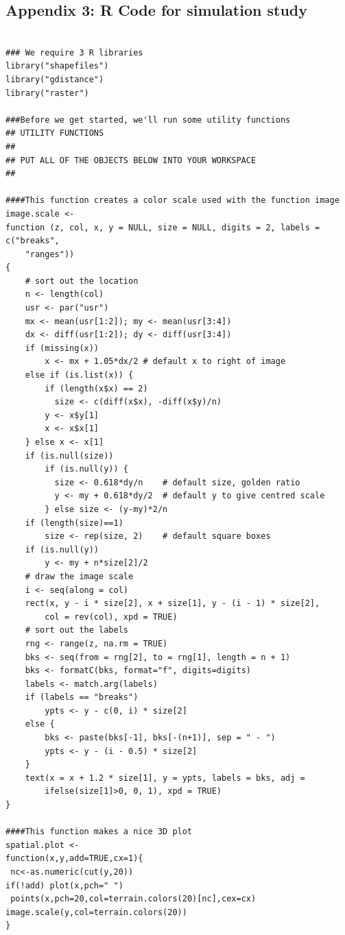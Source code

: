 \documentclass[12pt]{article}
\begin{document}
\begin{spacing}{1.2}
\newpage

\section*{Appendix 3: {\bf R} Code for simulation study }

{\tiny
\begin{verbatim}

### We require 3 R libraries
library("shapefiles")
library("gdistance")
library("raster")

###Before we get started, we'll run some utility functions 
## UTILITY FUNCTIONS 
## 
## PUT ALL OF THE OBJECTS BELOW INTO YOUR WORKSPACE
##

####This function creates a color scale used with the function image
image.scale <-
function (z, col, x, y = NULL, size = NULL, digits = 2, labels = c("breaks", 
    "ranges"))
{
    # sort out the location
    n <- length(col)
    usr <- par("usr")
    mx <- mean(usr[1:2]); my <- mean(usr[3:4])
    dx <- diff(usr[1:2]); dy <- diff(usr[3:4])
    if (missing(x))
        x <- mx + 1.05*dx/2	# default x to right of image
    else if (is.list(x)) {
        if (length(x$x) == 2) 
          size <- c(diff(x$x), -diff(x$y)/n)
        y <- x$y[1]
        x <- x$x[1]
    } else x <- x[1]
    if (is.null(size))
        if (is.null(y)) {
          size <- 0.618*dy/n	# default size, golden ratio
          y <- my + 0.618*dy/2	# default y to give centred scale
        } else size <- (y-my)*2/n
    if (length(size)==1)
        size <- rep(size, 2)	# default square boxes
    if (is.null(y))
        y <- my + n*size[2]/2
    # draw the image scale
    i <- seq(along = col)
    rect(x, y - i * size[2], x + size[1], y - (i - 1) * size[2], 
        col = rev(col), xpd = TRUE)
    # sort out the labels
    rng <- range(z, na.rm = TRUE)
    bks <- seq(from = rng[2], to = rng[1], length = n + 1)
    bks <- formatC(bks, format="f", digits=digits)
    labels <- match.arg(labels)
    if (labels == "breaks")
        ypts <- y - c(0, i) * size[2]
    else {
        bks <- paste(bks[-1], bks[-(n+1)], sep = " - ")
        ypts <- y - (i - 0.5) * size[2]
    }
    text(x = x + 1.2 * size[1], y = ypts, labels = bks, adj =
        ifelse(size[1]>0, 0, 1), xpd = TRUE) 
}

####This function makes a nice 3D plot
spatial.plot <-
function(x,y,add=TRUE,cx=1){
 nc<-as.numeric(cut(y,20))
if(!add) plot(x,pch=" ")
 points(x,pch=20,col=terrain.colors(20)[nc],cex=cx)
image.scale(y,col=terrain.colors(20))
}


\end{verbatim}}
\end{spacing}
\end{document}
